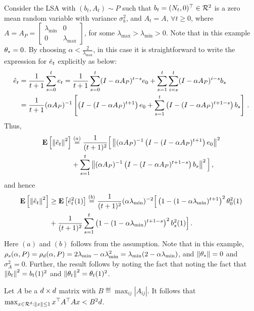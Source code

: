Consider the LSA with $(b_t,A_t)\sim P$ such that $b_t=(N_t,0)^\top\in\mathcal{R}^2$ is a zero mean \iid random variable with variance $\sigma^2_b$, and $A_t=A,\,\forall t\geq 0$, where $A=A_P=\begin{bmatrix} \lambda_{\min} &0\\ 0& \lambda_{\max}\end{bmatrix}$, for some $\lambda_{\max}>\lambda_{\min}>0$. Note that in this example $\theta_*=0$.
By choosing $\alpha<\frac2{\lambda_{\max}}$, in this case it is straightforward to write the expression for $\hat{e}_t$ explicitly as below:
\begin{align*}
\hat{e}_t&=\frac{1}{t+1}\sum_{s=0}^t e_t = \frac{1}{t+1}\sum_{s=0}^t (I-\alpha A_P)^{t-s} e_0 + \sum_{s=1}^t \sum_{i=s}^t (I-\alpha A_P)^{i-s} b_s\\
&=\frac{1}{t+1}(\alpha A_P)^{-1}\left[\left(I-(I-\alpha A_P)^{t+1}\right)e_0 + \sum_{s=1}^t \left(I-(I-\alpha A_P)^{t+1-s}\right) b_s\right]\,.
\end{align*}
Thus,
\begin{align*}
\mathbf{E}\left[\left\| \hat{e}_t\right\|^2\right]&\stackrel{(a)}{=}\frac{1}{(t+1)^2}\Big[\left\| (\alpha A_P)^{-1}\left(I-(I-\alpha A_P)^{t+1}\right)e_0\right\|^2 \\ 
&+\sum_{s=1}^t \left\| (\alpha A_P)^{-1}\left(I-(I-\alpha A_P)^{t+1-s}\right)b_s\right\|^2\Big]\,,
\end{align*}
and hence
\begin{align*}
\mathbf{E}\left[\left\| \hat{e}_t\right\|^2\right]
& \geq \mathbf{E}\left[\hat{e}^2_t(1)\right]\stackrel{(b)}{=}\frac{1}{(t+1)^2}(\alpha \lambda_{\min})^{-2}\Big[\left(1-(1-\alpha \lambda_{\min})^{t+1}\right)^2 \theta^2_0(1)\\
& + \frac{1}{(t+1)^2}\sum_{s=1}^t\left(1-(1-\alpha \lambda_{\min})^{t+1-s}\right)^2 b^2_s(1) \Big]\,.
\end{align*}
Here $(a)$ and $(b)$ follows from the \iid assumption. Note that in this example, $\rho_s(\alpha,P)=\rho_d(\alpha,P)=2\lambda_{\min} -\alpha \lambda_{\min}^2=\lambda_{\min}(2-\alpha \lambda_{\min})$, and $\left\| \theta_*\right\|=0$ and $\sigma^2_A=0$. Further, the result follows by noting the fact that noting the fact that $\left\| b_t\right\|^2=b_t(1)^2$ and $\left\| \theta_t\right\|^2=\theta_t(1)^2$.
\begin{lemma}\label{lm:matnorm}
Let $A$ be a $d \times d$ matrix with $B\eqdef\max_{ij}\left|A_{ij}\right|$. It follows that $\max_{x\in \mathcal{R}^d: \left\| x\right\|\leq1}x^\top A^\top A x <B^2d$.
\end{lemma}

